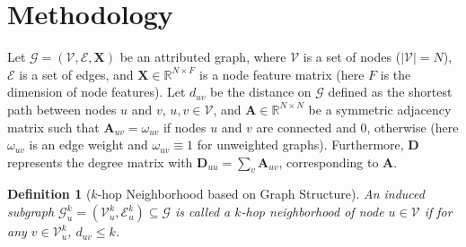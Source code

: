 \documentclass[letterpaper]{article} %
\newtheorem{definition}{Definition} %
\begin{document}
\section{Methodology}
Let $\mathcal{G} = (\mathcal{V}, \mathcal{E}, \boldsymbol{X})$ be an attributed graph, where $\mathcal{V}$ is a set of nodes ($|\mathcal{V}|=N$), $\mathcal{E}$ is a set of edges, and $\boldsymbol{X} \in \mathbb{R}^{N \times F}$ is a node feature matrix (here $F$ is the dimension of node features). Let $d_{uv}$ be the distance on $\mathcal{G}$ defined as the shortest path between nodes $u$ and $v$, $u,v\in \mathcal{V}$, and $\boldsymbol{A} \in \mathbb{R}^{N \times N}$ be a symmetric adjacency matrix such that
$\boldsymbol{A}_{uv} = \omega_{uv}$ if nodes $u$ and $v$ are connected and 0, otherwise
(here $\omega_{uv}$ is an edge weight and $\omega_{uv}\equiv 1$ for unweighted graphs).
Furthermore, $\boldsymbol{D}$ represents the degree matrix with $\boldsymbol{D}_{uu} = \sum_v \boldsymbol{A}_{uv}$, corresponding to $\boldsymbol{A}$.
\begin{definition}[\footnotesize{$k$-hop Neighborhood based on Graph Structure}]
\label{def1}
An induced subgraph $\mathcal{G}^k_u=(\mathcal{V}^k_u, \mathcal{E}^k_u)\subseteq \mathcal{G}$ is called a $k$-hop neighborhood of node $u\in \mathcal{V}$ if for any $v\in \mathcal{V}^k_u$, $d_{uv}\leq k$. %
\end{definition}
\end{document}
